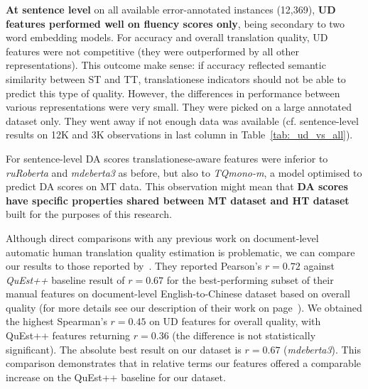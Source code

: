 \textbf{At sentence level} on all available error-annotated instances (12,369), \textbf{UD features performed well on fluency scores only}, being secondary to two word embedding models. For accuracy and overall translation quality, UD features were not competitive (they were outperformed by all other representations). This outcome make sense: if accuracy reflected semantic similarity between ST and TT, translationese indicators should not be able to predict this type of quality. However, the differences in performance between various representations were very small. They were picked on a large annotated dataset only. They went away if not enough data was available (cf. sentence-level results on 12K and 3K observations in last column in Table~\ref{tab:_ud_vs_all}).

For sentence-level DA scores translationese-aware features were inferior to \textit{ruRoberta} and \textit{mdeberta3} as before, but also to \textit{TQmono-m}, a model optimised to predict DA scores on MT data. This observation might mean that \textbf{DA scores have specific properties shared between MT dataset and HT dataset} built for the purposes of this research. 

Although direct comparisons with any previous work on document-level automatic human translation quality estimation is problematic, we can compare our results to those reported by~\cite{Yuan2018}. %
They reported Pearson's $r=0.72$ against \textit{QuEst++} baseline result of $r=0.67$ for the best-performing subset of their manual features on document-level English-to-Chinese dataset based on overall quality (for more details see our description of their work on page~\pageref{pg:yuan_previous}). %
We obtained the highest Spearman's $r=0.45$ on UD features for overall quality, with QuEst++ features returning $r=0.36$ (the difference is not statistically significant). The absolute best result on our dataset is $r=0.67$ (\textit{mdeberta3}). This comparison demonstrates that in relative terms our features offered a comparable increase on the QuEst++ baseline for our dataset. %


